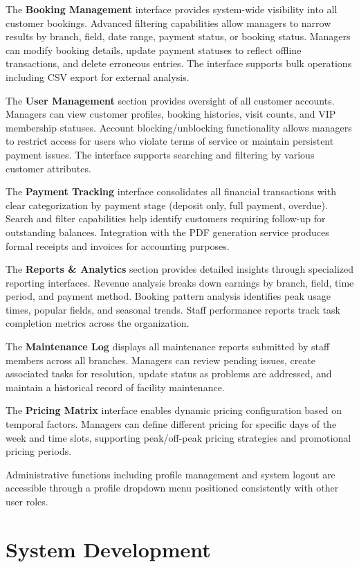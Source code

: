 The \textbf{Booking Management} interface provides system-wide visibility into all customer bookings. Advanced filtering capabilities allow managers to narrow results by branch, field, date range, payment status, or booking status. Managers can modify booking details, update payment statuses to reflect offline transactions, and delete erroneous entries. The interface supports bulk operations including CSV export for external analysis.

The \textbf{User Management} section provides oversight of all customer accounts. Managers can view customer profiles, booking histories, visit counts, and VIP membership statuses. Account blocking/unblocking functionality allows managers to restrict access for users who violate terms of service or maintain persistent payment issues. The interface supports searching and filtering by various customer attributes.

The \textbf{Payment Tracking} interface consolidates all financial transactions with clear categorization by payment stage (deposit only, full payment, overdue). Search and filter capabilities help identify customers requiring follow-up for outstanding balances. Integration with the PDF generation service produces formal receipts and invoices for accounting purposes.

The \textbf{Reports \& Analytics} section provides detailed insights through specialized reporting interfaces. Revenue analysis breaks down earnings by branch, field, time period, and payment method. Booking pattern analysis identifies peak usage times, popular fields, and seasonal trends. Staff performance reports track task completion metrics across the organization.

The \textbf{Maintenance Log} displays all maintenance reports submitted by staff members across all branches. Managers can review pending issues, create associated tasks for resolution, update status as problems are addressed, and maintain a historical record of facility maintenance.

The \textbf{Pricing Matrix} interface enables dynamic pricing configuration based on temporal factors. Managers can define different pricing for specific days of the week and time slots, supporting peak/off-peak pricing strategies and promotional pricing periods.

Administrative functions including profile management and system logout are accessible through a profile dropdown menu positioned consistently with other user roles.

\section{System Development}

